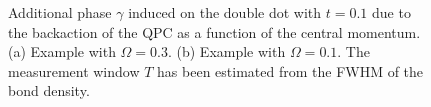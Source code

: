 \documentclass{article}
\begin{document}
\begin{figure}[h]
\begin{subfigure}[b]{0.45\textwidth}
        \caption{}
    \end{subfigure}
    \caption{Additional phase $\gamma$ induced on the double dot with $t=0.1$ due to
     the backaction of the QPC as a function of the central momentum. (a) Example with $\Omega=0.3$.
     (b) Example with $\Omega=0.1$. The measurement window $T$ has been estimated from 
     the FWHM of the bond density.}
    \label{fig:phase_backaction}
\end{figure}



\end{document}
